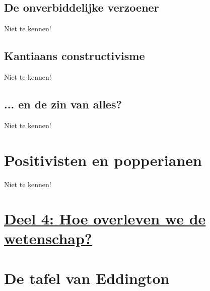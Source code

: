 \documentclass[11pt,a4paper]{article}
\begin{document}
\subsection{De onverbiddelijke verzoener}
Niet te kennen!
\subsection{Kantiaans constructivisme}
Niet te kennen!
\subsection{... en de zin van alles?}
Niet te kennen!
\section{Positivisten en popperianen}
Niet te kennen!
\section*{\centering \underline{Deel 4: Hoe overleven we de wetenschap?}}
\section{De tafel van Eddington}
\end{document}
